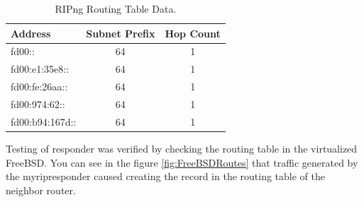 \documentclass[10pt,a4paper,titlepage]{article}
\begin{document}
            \begin{table}[h!]
                \begin{center}
                \begin{tabular}{|lcc|} \hline
                    Address         & Subnet Prefix & Hop Count \\ \hline
                    fd00::          & 64            & 1 \\
                    fd00:e1:35e8::  & 64            & 1 \\
                    fd00:fe:26aa::  & 64            & 1 \\
                    fd00:974:62::   & 64            & 1 \\ 
                    fd00:b94:167d:: & 64            & 1 \\ \hline
                \end{tabular}
                \caption{RIPng Routing Table Data. \label{tab:ripngroutingdata}}
                \end{center}
            \end{table}

            Testing of responder was verified by checking the routing table in the virtualized
            FreeBSD. You can see in the figure \ref{fig:FreeBSDRoutes} that traffic generated
            by the myripresponder caused creating the record in the routing table of the neighbor router.

            

    
    \newpage
    \printbibliography
    
    
\end{document}
